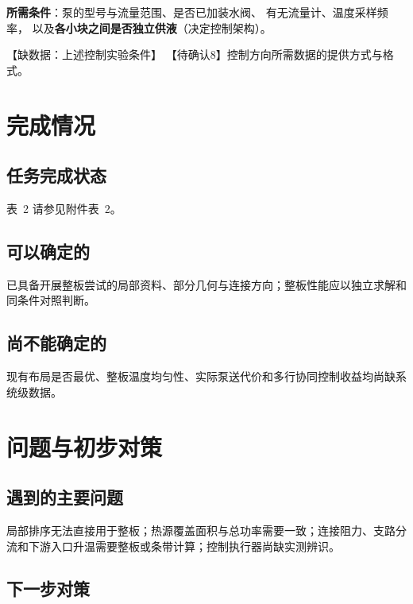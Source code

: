\documentclass[stage2,fontset=fandol]{ydzjreport}
\makeatletter
\newcommand{\submissionnumber}[1]{\def\@currentlabel{#1}}
\makeatother
\begin{document}
\textbf{所需条件}：泵的型号与流量范围、是否已加装水阀、
有无流量计、温度采样频率，
以及\textbf{各小块之间是否独立供液}（决定控制架构）。

【缺数据：上述控制实验条件】
【待确认8】控制方向所需数据的提供方式与格式。


\section{完成情况}

\subsection{任务完成状态}


\par\noindent \begingroup\submissionnumber{2}\label{tab:tasks}\endgroup 表~2 请参见附件表~2。\par




\subsection{可以确定的}

已具备开展整板尝试的局部资料、部分几何与连接方向；整板性能应以独立求解和同条件对照判断。

\subsection{尚不能确定的}

现有布局是否最优、整板温度均匀性、实际泵送代价和多行协同控制收益均尚缺系统级数据。

\section{问题与初步对策}

\subsection{遇到的主要问题}

局部排序无法直接用于整板；热源覆盖面积与总功率需要一致；连接阻力、支路分流和下游入口升温需要整板或条带计算；控制执行器尚缺实测辨识。

\subsection{下一步对策}
\end{document}
